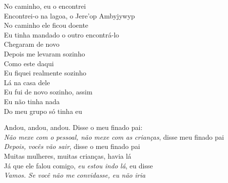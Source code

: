 \noindent   No caminho, eu o encontrei\\
  Encontrei-o na lagoa, o Jere'op Ambyjywyp\\
  No caminho ele ficou doente\\
  Eu tinha mandado o outro encontrá-lo\\
  Chegaram de novo\\
  Depois me levaram sozinho\\
  Como este daqui\\
  Eu fiquei realmente sozinho\\
  Lá na casa dele\\
  Eu fui de novo sozinho, assim\\
  Eu não tinha nada\\
  Do meu grupo só tinha eu
 
 \smallskip
 \begin{center}\end{center}
 \smallskip
 
\noindent   Andou, andou, andou. Disse o meu finado pai:\\
  \textit{Não mexe com o pessoal, não mexe com as crianças}, disse meu finado pai\\
  \textit{Depois, vocês vão sair}, disse o meu finado pai\\
  Muitas mulheres, muitas crianças, havia lá\\
  Já que ele falou comigo, \textit{eu estou indo lá}, eu disse\\
  \textit{Vamos. Se você não me convidasse, eu não iria}
 
